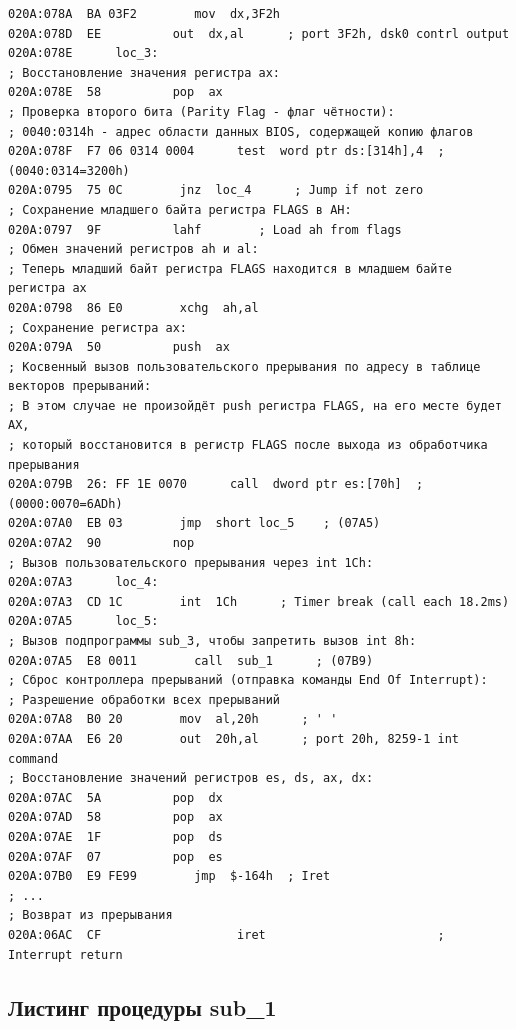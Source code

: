 \documentclass[a4paper,12pt]{article}
\begin{document}
\begin{lstlisting}[style={asm}]
020A:078A  BA 03F2        mov  dx,3F2h
020A:078D  EE          out  dx,al      ; port 3F2h, dsk0 contrl output
020A:078E      loc_3:
; Восстановление значения регистра ax:
020A:078E  58          pop  ax 
; Проверка второго бита (Parity Flag - флаг чётности):
; 0040:0314h - адрес области данных BIOS, содержащей копию флагов
020A:078F  F7 06 0314 0004      test  word ptr ds:[314h],4  ; (0040:0314=3200h)
020A:0795  75 0C        jnz  loc_4      ; Jump if not zero
; Сохранение младшего байта регистра FLAGS в AH:
020A:0797  9F          lahf        ; Load ah from flags
; Обмен значений регистров ah и al: 
; Теперь младший байт регистра FLAGS находится в младшем байте регистра ax
020A:0798  86 E0        xchg  ah,al
; Сохранение регистра ax:
020A:079A  50          push  ax
; Косвенный вызов пользовательского прерывания по адресу в таблице векторов прерываний:
; В этом случае не произойдёт push регистра FLAGS, на его месте будет AX, 
; который восстановится в регистр FLAGS после выхода из обработчика прерывания
020A:079B  26: FF 1E 0070      call  dword ptr es:[70h]  ; (0000:0070=6ADh)
020A:07A0  EB 03        jmp  short loc_5    ; (07A5)
020A:07A2  90          nop
; Вызов пользовательского прерывания через int 1Ch:
020A:07A3      loc_4:
020A:07A3  CD 1C        int  1Ch      ; Timer break (call each 18.2ms)
020A:07A5      loc_5:
; Вызов подпрограммы sub_3, чтобы запретить вызов int 8h:
020A:07A5  E8 0011        call  sub_1      ; (07B9)
; Сброс контроллера прерываний (отправка команды End Of Interrupt):
; Разрешение обработки всех прерываний
020A:07A8  B0 20        mov  al,20h      ; ' '
020A:07AA  E6 20        out  20h,al      ; port 20h, 8259-1 int command
; Восстановление значений регистров es, ds, ax, dx:
020A:07AC  5A          pop  dx
020A:07AD  58          pop  ax
020A:07AE  1F          pop  ds
020A:07AF  07          pop  es
020A:07B0  E9 FE99        jmp  $-164h  ; Iret 
; ...
; Возврат из прерывания
020A:06AC  CF					iret						; Interrupt return
\end{lstlisting}

\subsection{Листинг процедуры sub\_1}
\end{document}
